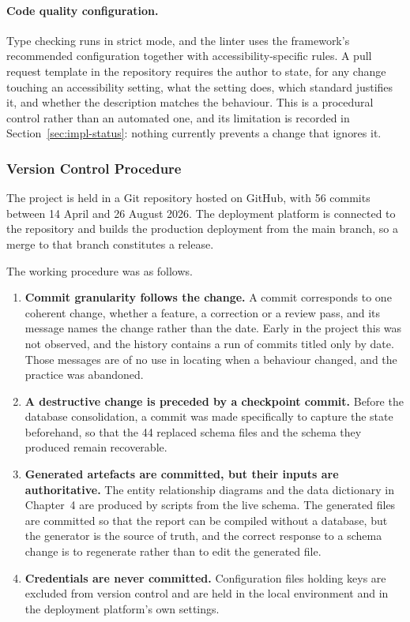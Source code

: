 \documentclass[12pt, oneside]{article} %
\begin{document}
\paragraph{Code quality configuration.} Type checking runs in strict mode, and the linter uses the framework's recommended configuration together with accessibility-specific rules. A pull request template in the repository requires the author to state, for any change touching an accessibility setting, what the setting does, which standard justifies it, and whether the description matches the behaviour. This is a procedural control rather than an automated one, and its limitation is recorded in Section~\ref{sec:impl-status}: nothing currently prevents a change that ignores it.

\subsubsection{Version Control Procedure}

The project is held in a Git repository hosted on GitHub, with 56 commits between 14 April and 26 August 2026. The deployment platform is connected to the repository and builds the production deployment from the main branch, so a merge to that branch constitutes a release.

The working procedure was as follows.

\begin{enumerate}
    \item \textbf{Commit granularity follows the change.} A commit corresponds to one coherent change, whether a feature, a correction or a review pass, and its message names the change rather than the date. Early in the project this was not observed, and the history contains a run of commits titled only by date. Those messages are of no use in locating when a behaviour changed, and the practice was abandoned.
    \item \textbf{A destructive change is preceded by a checkpoint commit.} Before the database consolidation, a commit was made specifically to capture the state beforehand, so that the 44 replaced schema files and the schema they produced remain recoverable.
    \item \textbf{Generated artefacts are committed, but their inputs are authoritative.} The entity relationship diagrams and the data dictionary in Chapter~4 are produced by scripts from the live schema. The generated files are committed so that the report can be compiled without a database, but the generator is the source of truth, and the correct response to a schema change is to regenerate rather than to edit the generated file.
    \item \textbf{Credentials are never committed.} Configuration files holding keys are excluded from version control and are held in the local environment and in the deployment platform's own settings.
\end{enumerate}
\end{document}
